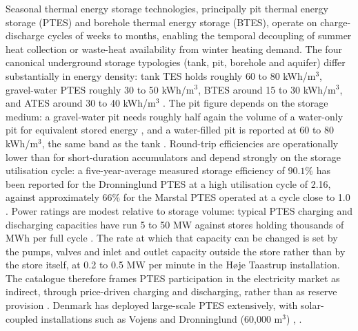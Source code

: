Seasonal thermal energy storage technologies, principally pit thermal energy storage (PTES) and borehole thermal energy storage (BTES), operate on charge-discharge cycles of weeks to months, enabling the temporal decoupling of summer heat collection or waste-heat availability from winter heating demand. The four canonical underground storage typologies (tank, pit, borehole and aquifer) differ substantially in energy density: tank TES holds roughly 60 to 80 kWh/m$^3$, gravel-water PTES roughly 30 to 50 kWh/m$^3$, BTES around 15 to 30 kWh/m$^3$, and ATES around 30 to 40 kWh/m$^3$ \cite{dahash_advances_2019}. The pit figure depends on the storage medium: a gravel-water pit needs roughly half again the volume of a water-only pit for equivalent stored energy \cite{dahash_advances_2019}, and a water-filled pit is reported at 60 to 80 kWh/m$^3$, the same band as the tank \cite{sipos_power_heat_2025}. Round-trip efficiencies are operationally lower than for short-duration accumulators and depend strongly on the storage utilisation cycle: a five-year-average measured storage efficiency of $90.1\%$ has been reported for the Dronninglund PTES at a high utilisation cycle of 2.16, against approximately $66\%$ for the Marstal PTES operated at a cycle close to 1.0 \cite{pan_long-term_2022}. Power ratings are modest relative to storage volume: typical PTES charging and discharging capacities have run 5 to 50 MW against stores holding thousands of MWh per full cycle \cite{danish_energy_agency_energy_2025}. The rate at which that capacity can be changed is set by the pumps, valves and inlet and outlet capacity outside the store rather than by the store itself, at 0.2 to 0.5 MW per minute in the Høje Taastrup installation. The catalogue therefore frames PTES participation in the electricity market as indirect, through price-driven charging and discharging, rather than as reserve provision \cite{danish_energy_agency_energy_2025}. Denmark has deployed large-scale PTES extensively, with solar-coupled installations such as Vojens and Dronninglund (60,000 m$^3$) \cite{dahash_advances_2019}, \cite{pan_long-term_2022}.

